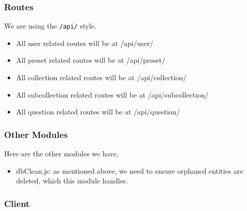 \documentclass{article}
\begin{document}
\subsubsection*{Routes}
We are using the \texttt{/api/} style.
\begin{itemize}
    \item All user related routes will be at /api/user/
    \item All preset related routes will be at /api/preset/
    \item All collection related routes will be at /api/collection/
    \item All subcollection related routes will be at /api/subcollection/
    \item All question related routes will be at /api/question/
\end{itemize}

\subsubsection*{Other Modules}
Here are the other modules we have,
\begin{itemize}
    \item dbClean.js: as mentioned above, we need to ensure orphaned entities are deleted, which this module handles.
\end{itemize}

\subsubsection*{Client}
\end{document}
